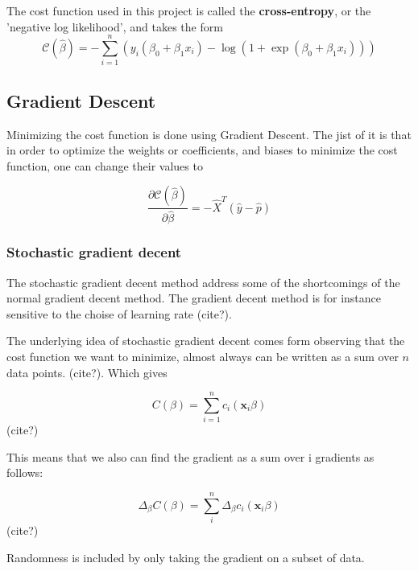 The cost function used in this project is called the \textbf{cross-entropy}, or the
'negative log likelihood', and takes the form
\begin{equation}\label{eq:cross-entropy}
	\mathcal{C}(\hat{\beta})=-\sum_{i=1}^n  \left(y_i(\beta_0+\beta_1x_i) -\log{(1+\exp{(\beta_0+\beta_1x_i)})}\right)
\end{equation}

\subsection{Gradient Descent}\label{seq:gradient}
Minimizing the cost function is done using Gradient Descent.
The jist of it is that in order to optimize the weights or coefficients,
and biases to minimize the cost function, one can change their values to

\begin{equation}\label{eq:delta-c}
	\frac{\partial \mathcal{C}(\hat{\beta})}{\partial \hat{\beta}} = -\hat{X}^T\left(\hat{y}-\hat{p}\right)
\end{equation}

\subsubsection{Stochastic gradient decent}
The stochastic gradient decent method address some of the shortcomings
of the normal gradient decent method. The gradient decent method is
for instance sensitive to the choise of learning rate (cite?).

The underlying idea of stochastic gradient decent comes form observing
that the cost function we want to minimize, almost always can be written as
a sum over \(n\) data points. (cite?). Which gives

\begin{equation}
	C(\beta) = \sum\limits_{i=1}^n c_i (\mathbf{x}_i\beta)
\end{equation} (cite?)

This means that we also can find the gradient as a sum over i gradients
as follows:

\begin{equation}
	\Delta_{\beta} C(\beta) = \sum\limits_{i}^n \Delta_{\beta}c_i (\mathbf{x}_i\beta)
\end{equation} (cite?)

Randomness is included by only taking the gradient on a subset of data.

